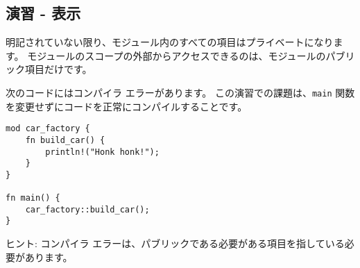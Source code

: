 \subsection{演習 - 表示}

明記されていない限り、モジュール内のすべての項目はプライベートになります。 モジュールのスコープの外部からアクセスできるのは、モジュールのパブリック項目だけです。

次のコードにはコンパイラ エラーがあります。 この演習での課題は、\texttt{main} 関数を変更せずにコードを正常にコンパイルすることです。

\begin{lstlisting}[numbers=none]
mod car_factory {
    fn build_car() {
        println!("Honk honk!");
    }
}

fn main() {
    car_factory::build_car();
}
\end{lstlisting}

ヒント: コンパイラ エラーは、パブリックである必要がある項目を指している必要があります。

